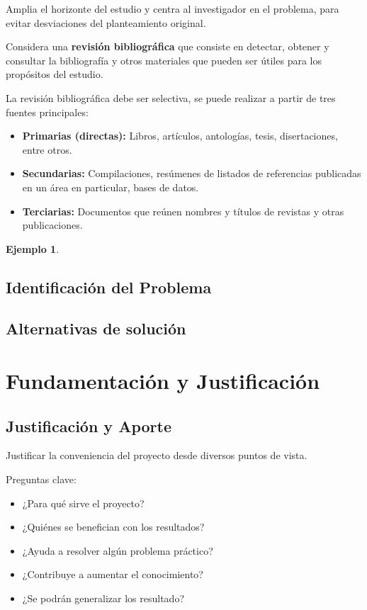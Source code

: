 \documentclass[letter,12pt]{report}
\newcommand\naranjo[1]{\textcolor[rgb]{1.00,0.36,0.06}{\textbf{#1}}}
\newtheorem{ejemplo}{Ejemplo}
\begin{document}
 Amplia el horizonte del estudio y centra al investigador en el problema, para evitar desviaciones del planteamiento original.

Considera una \naranjo{revisión bibliográfica} que consiste en detectar, obtener y consultar la bibliografía y otros materiales que pueden ser útiles para los propósitos del estudio.

La revisión bibliográfica debe ser selectiva, se puede realizar a partir de tres fuentes principales:

\begin{itemize}\justifying
  \item \naranjo{Primarias (directas):} Libros, artículos, antologías, tesis, disertaciones, entre otros.
  \item \naranjo{Secundarias:} Compilaciones, resúmenes de listados de referencias publicadas en un área en particular, bases de datos.
  \item \naranjo{Terciarias:} Documentos que reúnen nombres y títulos de revistas y otras publicaciones.
\end{itemize}


\begin{ejemplo}
\blindtext %
\end{ejemplo} 

\section{Identificación del Problema}

\section{Alternativas de solución}\label{alternativas}






\chapter{Fundamentación y Justificación}\label{fundamentacion}
\section{Justificación y Aporte}
Justificar la conveniencia del proyecto desde diversos puntos de vista.

Preguntas clave:
  \begin{itemize}
  \item ¿Para qué sirve el proyecto?
  \item ¿Quiénes se benefician con los resultados?
  \item ¿Ayuda a resolver algún problema práctico?
  \item ¿Contribuye a aumentar el conocimiento?
  \item ¿Se podrán generalizar los resultado?
\end{itemize}
\end{document}
